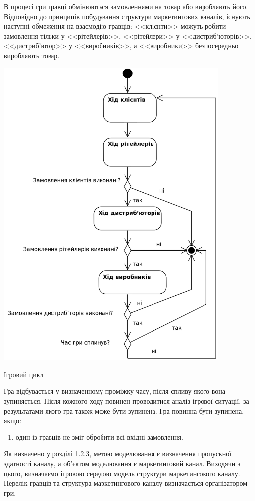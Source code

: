 В процесі гри гравці обмінюються замовленнями на товар або виробляють його. Відповідно до принципів побудування структури маркетингових каналів, існують наступні обмеження на взаємодію гравців: <<клієнти>> можуть робити замовлення тільки у <<рітейлерів>>, <<рітейлери>> у <<дистриб’юторів>>, <<дистриб’ютор>> у <<виробників>>, а <<виробники>> безпосередньо виробляють товар.
\begin{stdfigure}  
                \includegraphics[width=4.5in]{images/game_loop.png}
                \caption{Ігровий цикл}
                \label{fig:game_loop}
            \end{stdfigure}
Гра відбувається у визначенному проміжку часу, після спливу якого вона зупиняється. Після кожного ходу повинен проводитися аналіз ігрової ситуації, за результатами якого гра також може бути зупинена. Гра повинна бути зупинена, якщо: 
\begin{enumerate}
\item один із гравців не зміг обробити всі вхідні замовлення.
\end{enumerate}
 
Як визначено у розділі 1.2.3, метою моделювання є визначення пропускної здатності каналу, а об’єктом моделювання є маркетинговий канал. Виходячи з цього, визначаємо ігровою середою модель структури маркетингового каналу. Перелік гравців та структура маркетингового каналу визначається організатором гри.


